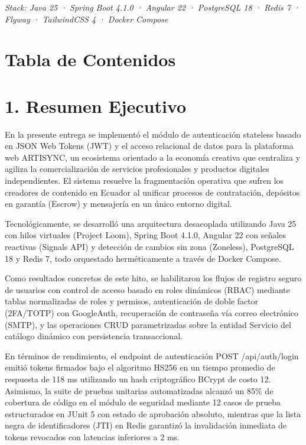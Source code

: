 \documentclass[
]{article}
\begin{document}
\emph{Stack: Java 25 · Spring Boot 4.1.0 · Angular 22 · PostgreSQL 18 ·
Redis 7 · Flyway · TailwindCSS 4 · Docker Compose}

\section{Tabla de Contenidos}

\section{1. Resumen Ejecutivo}

En la presente entrega se implementó el módulo de autenticación
stateless basado en JSON Web Tokens (JWT) y el acceso relacional de
datos para la plataforma web ARTISYNC, un ecosistema orientado a la
economía creativa que centraliza y agiliza la comercialización de
servicios profesionales y productos digitales independientes. El sistema
resuelve la fragmentación operativa que sufren los creadores de
contenido en Ecuador al unificar procesos de contratación, depósitos en
garantía (Escrow) y mensajería en un único entorno digital.

Tecnológicamente, se desarrolló una arquitectura desacoplada utilizando
Java 25 con hilos virtuales (Project Loom), Spring Boot 4.1.0, Angular
22 con señales reactivas (Signals API) y detección de cambios sin zona
(Zoneless), PostgreSQL 18 y Redis 7, todo orquestado herméticamente a
través de Docker Compose.

Como resultados concretos de este hito, se habilitaron los flujos de
registro seguro de usuarios con control de acceso basado en roles
dinámicos (RBAC) mediante tablas normalizadas de roles y permisos,
autenticación de doble factor (2FA/TOTP) con GoogleAuth, recuperación de
contraseña vía correo electrónico (SMTP), y las operaciones CRUD
parametrizadas sobre la entidad Servicio del catálogo dinámico con
persistencia transaccional.

En términos de rendimiento, el endpoint de autenticación POST
/api/auth/login emitió tokens firmados bajo el algoritmo HS256 en un
tiempo promedio de respuesta de 118 ms utilizando un hash criptográfico
BCrypt de costo 12. Asimismo, la suite de pruebas unitarias
automatizadas alcanzó un 85\% de cobertura de código en el módulo de
seguridad mediante 12 casos de prueba estructurados en JUnit 5 con
estado de aprobación absoluto, mientras que la lista negra de
identificadores (JTI) en Redis garantizó la invalidación inmediata de
tokens revocados con latencias inferiores a 2 ms.
\end{document}
